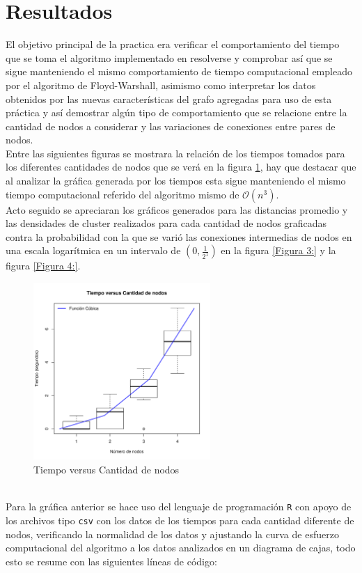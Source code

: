 \documentclass[12pt]{article}
\begin{document}
\section{Resultados}
El objetivo principal de la practica era verificar el comportamiento del tiempo que se toma el algoritmo implementado en resolverse y comprobar así que se sigue manteniendo el mismo comportamiento de tiempo computacional empleado por el algoritmo de Floyd-Warshall, asimismo como interpretar los datos obtenidos por las nuevas características del grafo agregadas para uso de esta práctica y así demostrar algún tipo de comportamiento que se relacione entre la cantidad de nodos a considerar y las variaciones de conexiones entre pares de nodos.\\
Entre las siguientes figuras se mostrara la relación de los tiempos tomados para los diferentes cantidades de nodos que se verá en la figura \ref{Figura 2:}, hay que destacar que al analizar la gráfica generada por los tiempos esta sigue manteniendo el mismo tiempo computacional referido del algoritmo mismo de $\mathcal{O}$$(n^3)$.
\\Acto seguido se apreciaran los gráficos generados para las distancias promedio y las densidades de cluster realizados para cada cantidad de nodos graficadas contra la probabilidad con la que se varió las conexiones intermedias de nodos en una escala logarítmica en un intervalo de $(0,\frac{1}{2^1})$ en la figura \ref{Figura 3:} y la figura \ref{Figura 4:}.\\
\begin{figure}[h!]
	\centering
	\includegraphics[width=0.6\textwidth]{TiempovsN}
	\caption{Tiempo versus Cantidad de nodos\label{Figura 2:}}
\end{figure}
\\Para la gráfica anterior se hace uso del lenguaje de programación \texttt{R}\cite{R} con apoyo de los archivos tipo \texttt{csv} con los datos de los tiempos para cada cantidad diferente de nodos, verificando la normalidad de los datos y ajustando la curva de esfuerzo computacional del algoritmo a los datos analizados en un diagrama de cajas, todo esto se resume con las siguientes líneas de código:
$$
\end{document}
